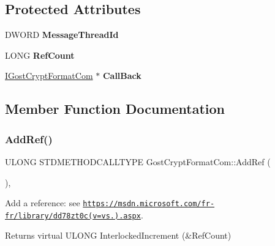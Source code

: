 \subsection*{Protected Attributes}
\begin{DoxyCompactItemize}
\item 
\mbox{\label{class_gost_crypt_format_com_ab73627af352f634140676d4c453ea3ca}} 
D\+W\+O\+RD {\bfseries Message\+Thread\+Id}
\item 
\mbox{\label{class_gost_crypt_format_com_a6696556c6aee3310ba88db6a95f9eeac}} 
L\+O\+NG {\bfseries Ref\+Count}
\item 
\mbox{\label{class_gost_crypt_format_com_a3a54553ec6dcadadc100ffbd3e68a14f}} 
\hyperlink{interface_gost_crypt_format_com_1_1_i_gost_crypt_format_com}{I\+Gost\+Crypt\+Format\+Com} $\ast$ {\bfseries Call\+Back}
\end{DoxyCompactItemize}


\subsection{Member Function Documentation}
\mbox{\label{class_gost_crypt_format_com_aa8ab201fd5ec791ed5d0e619cc268cef}} 
\subsubsection{\texorpdfstring{Add\+Ref()}{AddRef()}}
{\footnotesize\ttfamily U\+L\+O\+NG S\+T\+D\+M\+E\+T\+H\+O\+D\+C\+A\+L\+L\+T\+Y\+PE Gost\+Crypt\+Format\+Com\+::\+Add\+Ref (\begin{DoxyParamCaption}{ }\end{DoxyParamCaption})\hspace{0.3cm}{\ttfamily [inline]}, {\ttfamily [virtual]}}



Add a reference\+: see \href{https://msdn.microsoft.com/fr-fr/library/dd78zt0c(v=vs.110).aspx}{\tt https\+://msdn.\+microsoft.\+com/fr-\/fr/library/dd78zt0c(v=vs.).\+aspx}. 

\begin{DoxyReturn}{Returns}
virtual U\+L\+O\+NG Interlocked\+Increment (\&Ref\+Count) 
\end{DoxyReturn}
\mbox{\label{class_gost_crypt_format_com_a66daaf89c4923e1ad027381d15e535ba}} 
